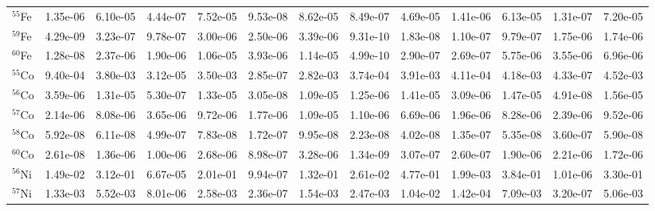 \begin{landscape}
\begin{table}
\begin{tabular}{l|cc|cc|cc|cc|cc|cc}
$^{55}$Fe & 1.35e-06 & 6.10e-05 & 4.44e-07 & 7.52e-05 & 9.53e-08 & 8.62e-05 & 8.49e-07 & 4.69e-05 & 1.41e-06 & 6.13e-05 & 1.31e-07 & 7.20e-05\\
$^{59}$Fe & 4.29e-09 & 3.23e-07 & 9.78e-07 & 3.00e-06 & 2.50e-06 & 3.39e-06 & 9.31e-10 & 1.83e-08 & 1.10e-07 & 9.79e-07 & 1.75e-06 & 1.74e-06\\
$^{60}$Fe & 1.28e-08 & 2.37e-06 & 1.90e-06 & 1.06e-05 & 3.93e-06 & 1.14e-05 & 4.99e-10 & 2.90e-07 & 2.69e-07 & 5.75e-06 & 3.55e-06 & 6.96e-06\\
$^{55}$Co & 9.40e-04 & 3.80e-03 & 3.12e-05 & 3.50e-03 & 2.85e-07 & 2.82e-03 & 3.74e-04 & 3.91e-03 & 4.11e-04 & 4.18e-03 & 4.33e-07 & 4.52e-03\\
$^{56}$Co & 3.59e-06 & 1.31e-05 & 5.30e-07 & 1.33e-05 & 3.05e-08 & 1.09e-05 & 1.25e-06 & 1.41e-05 & 3.09e-06 & 1.47e-05 & 4.91e-08 & 1.56e-05\\
$^{57}$Co & 2.14e-06 & 8.08e-06 & 3.65e-06 & 9.72e-06 & 1.77e-06 & 1.09e-05 & 1.10e-06 & 6.69e-06 & 1.96e-06 & 8.28e-06 & 2.39e-06 & 9.52e-06\\
$^{58}$Co & 5.92e-08 & 6.11e-08 & 4.99e-07 & 7.83e-08 & 1.72e-07 & 9.95e-08 & 2.23e-08 & 4.02e-08 & 1.35e-07 & 5.35e-08 & 3.60e-07 & 5.90e-08\\
$^{60}$Co & 2.61e-08 & 1.36e-06 & 1.00e-06 & 2.68e-06 & 8.98e-07 & 3.28e-06 & 1.34e-09 & 3.07e-07 & 2.60e-07 & 1.90e-06 & 2.21e-06 & 1.72e-06\\
$^{56}$Ni & 1.49e-02 & 3.12e-01 & 6.67e-05 & 2.01e-01 & 9.94e-07 & 1.32e-01 & 2.61e-02 & 4.77e-01 & 1.99e-03 & 3.84e-01 & 1.01e-06 & 3.30e-01\\
$^{57}$Ni & 1.33e-03 & 5.52e-03 & 8.01e-06 & 2.58e-03 & 2.36e-07 & 1.54e-03 & 2.47e-03 & 1.04e-02 & 1.42e-04 & 7.09e-03 & 3.20e-07 & 5.06e-03\\
\hline
\end{tabular}
\end{table}
\end{landscape}

